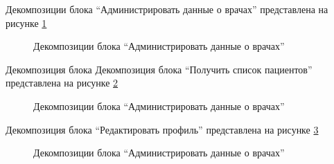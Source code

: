 \documentclass[14pt]{extreport}
\begin{document}
        Декомпозиции блока “Администрировать данные о врачах” представлена на рисунке \ref{context-doctor-admin}

        \begin{figure}[H]%
            \centering
            \caption{Декомпозиции блока “Администрировать данные о врачах”} \label{context-doctor-admin}
        \end{figure} 

        Декомпозиция блока Декомпозиция блока “Получить список пациентов” представлена на рисунке \ref{context-patient-list}

        \begin{figure}[H]%
            \centering
            \caption{Декомпозиции блока “Администрировать данные о врачах”} \label{context-patient-list}
        \end{figure} 
        
        Декомпозиция блока “Редактировать профиль” представлена на рисунке \ref{context-change-profile}

        \begin{figure}[H]%
            \centering
            \caption{Декомпозиции блока “Администрировать данные о врачах”} \label{context-change-profile}
        \end{figure} 
\end{document}
